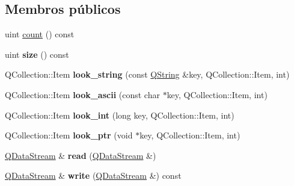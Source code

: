 \subsection*{Membros públicos}
\begin{DoxyCompactItemize}
\item 
uint \hyperlink{class_q_g_dict_a774149fc271ebaba2aabcd183a836e8f}{count} () const 
\item 
\hypertarget{class_q_g_dict_a7e63723212bed1ca52f0fe57e58b812e}{uint {\bfseries size} () const }\label{class_q_g_dict_a7e63723212bed1ca52f0fe57e58b812e}

\item 
\hypertarget{class_q_g_dict_a31f844b9636882a56f678d556b51a71c}{Q\-Collection\-::\-Item {\bfseries look\-\_\-string} (const \hyperlink{class_q_string}{Q\-String} \&key, Q\-Collection\-::\-Item, int)}\label{class_q_g_dict_a31f844b9636882a56f678d556b51a71c}

\item 
\hypertarget{class_q_g_dict_aa3682d7268024d0df71af04399deaabc}{Q\-Collection\-::\-Item {\bfseries look\-\_\-ascii} (const char $\ast$key, Q\-Collection\-::\-Item, int)}\label{class_q_g_dict_aa3682d7268024d0df71af04399deaabc}

\item 
\hypertarget{class_q_g_dict_afc275dab1a05f2c0f0a948b4042ee367}{Q\-Collection\-::\-Item {\bfseries look\-\_\-int} (long key, Q\-Collection\-::\-Item, int)}\label{class_q_g_dict_afc275dab1a05f2c0f0a948b4042ee367}

\item 
\hypertarget{class_q_g_dict_a5e6fe7c387f608ee8146498b3b9aa390}{Q\-Collection\-::\-Item {\bfseries look\-\_\-ptr} (void $\ast$key, Q\-Collection\-::\-Item, int)}\label{class_q_g_dict_a5e6fe7c387f608ee8146498b3b9aa390}

\item 
\hypertarget{class_q_g_dict_ab142b2e34eff3c5158dc9e9b629ac619}{\hyperlink{class_q_data_stream}{Q\-Data\-Stream} \& {\bfseries read} (\hyperlink{class_q_data_stream}{Q\-Data\-Stream} \&)}\label{class_q_g_dict_ab142b2e34eff3c5158dc9e9b629ac619}

\item 
\hypertarget{class_q_g_dict_a25d3618c02fcc4a8e4fde96b131d5348}{\hyperlink{class_q_data_stream}{Q\-Data\-Stream} \& {\bfseries write} (\hyperlink{class_q_data_stream}{Q\-Data\-Stream} \&) const }\label{class_q_g_dict_a25d3618c02fcc4a8e4fde96b131d5348}

\end{DoxyCompactItemize}
